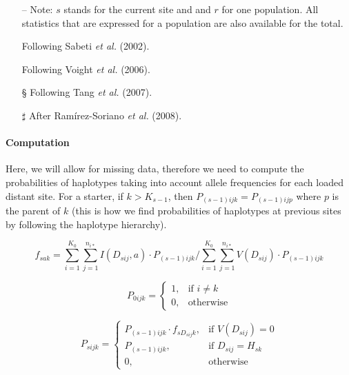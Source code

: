\documentclass{scrartcl}
\begin{document}
\begin{itemize}
    \item[--] Note: $s$ stands for the current site and and $r$ for one
        population. All statistics that are expressed for a population
        are also available for the total.
    \item[\dag] Following Sabeti \textit{et al.} (2002).
    \item[\ddag] Following Voight \textit{et al.} (2006).
    \item[\S] Following Tang \textit{et al.} (2007).
    \item[$\sharp$] After Ram\'irez-Soriano \textit{et al.} (2008).
\end{itemize}

\paragraph{Computation}

Here, we will allow for missing data, therefore we need to compute the
probabilities of haplotypes taking into account allele frequencies for
each loaded distant site. For a starter, if $k > K_{s-1}$, then
$P_{(s-1)ijk} = P_{(s-1)ijp}$ where $p$ is the parent of $k$ (this is
how we find probabilities of haplotypes at previous sites by following
the haplotype hierarchy).

\begin{displaymath}
f_{sak} = \sum_{i=1}^{K_0} { \sum_{j=1}^{n_{i*}} { I(D_{sij},a) \cdot P_{(s-1)ijk} } } /
    \sum_{i=1}^{K_0} { \sum_{j=1}^{n_{i*}} { V(D_{sij}) \cdot P_{(s-1)ijk} } }
\end{displaymath}

\begin{displaymath}
P_{0ijk} = \begin{cases}
    1, & \text{if } i \neq k\\
    0, & \text{otherwise}
  \end{cases}
\end{displaymath}

\begin{displaymath}
    P_{sijk} =
    \begin{cases}
        P_{(s-1)ijk} \cdot f_{sD_{sij}k} , & \text{if } V(D_{sij}) = 0 \\
        P_{(s-1)ijk} ,                     & \text{if } D_{sij} = H_{sk} \\
        0 ,                                & \text{otherwise}
    \end{cases}
\end{displaymath}
\end{document}
